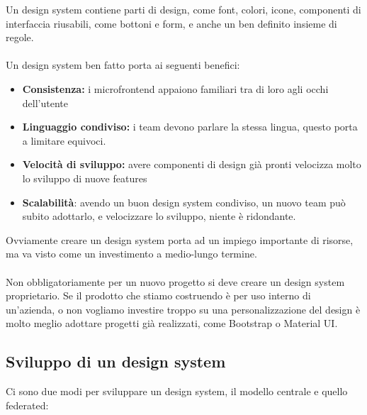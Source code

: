 Un design system contiene parti di design, come font, colori, icone, componenti di interfaccia riusabili, come bottoni 
e form, e anche un ben definito insieme di regole.
\\\\
Un design system ben fatto porta ai seguenti benefici:
\begin{itemize}
    \item \textbf{Consistenza:} i microfrontend appaiono familiari tra di loro agli occhi dell’utente
    \item \textbf{Linguaggio condiviso:} i team devono parlare la stessa lingua, questo porta a limitare equivoci.
    \item \textbf{Velocità di sviluppo:} avere componenti di design già pronti velocizza molto lo sviluppo di nuove features
    \item \textbf{Scalabilità}: avendo un buon design system condiviso, un nuovo team può subito adottarlo, e velocizzare lo sviluppo, niente è ridondante.
\end{itemize}
Ovviamente creare un design system porta ad un impiego importante di risorse, ma va visto come un investimento a medio-lungo termine.
\\\\
Non obbligatoriamente per un nuovo progetto si deve creare un design system proprietario.
Se il prodotto che stiamo costruendo è per uso interno di un’azienda, o non vogliamo investire troppo su una personalizzazione del design è molto meglio adottare progetti
 già realizzati, come Bootstrap o Material UI.

\subsection{Sviluppo di un design system}
Ci sono due modi per sviluppare un design system, il modello centrale e quello federated:


